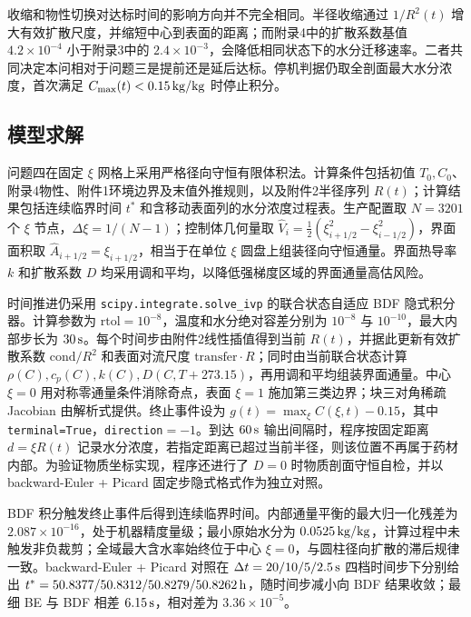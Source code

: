 \documentclass[UTF8,a4paper,12pt]{ctexart}
\numberwithin{equation}{section}
\begin{document}
收缩和物性切换对达标时间的影响方向并不完全相同。半径收缩通过 $1/R^2(t)$ 增大有效扩散尺度，并缩短中心到表面的距离；而附录4中的扩散系数基值 $4.2\times10^{-4}$ 小于附录3中的 $2.4\times10^{-3}$，会降低相同状态下的水分迁移速率。二者共同决定本问相对于问题三是提前还是延后达标。停机判据仍取全剖面最大水分浓度，首次满足 $C_{\max}(t)<0.15\rm\,kg/kg$ 时停止积分。

\subsection{模型求解}
问题四在固定 $\xi$ 网格上采用严格径向守恒有限体积法。计算条件包括初值 $T_0,C_0$、附录4物性、附件1环境边界及末值外推规则，以及附件2半径序列 $R(t)$；计算结果包括连续临界时间 $t^*$ 和含移动表面列的水分浓度过程表。生产配置取 $N=3201$ 个 $\xi$ 节点，$\Delta\xi=1/(N-1)$；控制体几何量取 $\hat V_i=\frac12(\xi_{i+1/2}^2-\xi_{i-1/2}^2)$，界面面积取 $\hat A_{i+1/2}=\xi_{i+1/2}$，相当于在单位 $\xi$ 圆盘上组装径向守恒通量。界面热导率 $k$ 和扩散系数 $D$ 均采用调和平均，以降低强梯度区域的界面通量高估风险。

时间推进仍采用 \texttt{scipy.integrate.solve\_ivp} 的联合状态自适应 BDF 隐式积分器。计算参数为 $\mathrm{rtol}=10^{-8}$，温度和水分绝对容差分别为 $10^{-8}$ 与 $10^{-10}$，最大内部步长为 $30\rm\,s$。每个时间步由附件2线性插值得到当前 $R(t)$，并据此更新有效扩散系数 $\mathrm{cond}/R^2$ 和表面对流尺度 $\mathrm{transfer}\cdot R$；同时由当前联合状态计算 $\rho(C),c_p(C),k(C),D(C,T+273.15)$，再用调和平均组装界面通量。中心 $\xi=0$ 用对称零通量条件消除奇点，表面 $\xi=1$ 施加第三类边界；块三对角稀疏 Jacobian 由解析式提供。终止事件设为 $g(t)=\max_\xi C(\xi,t)-0.15$，其中 \texttt{terminal=True}，\texttt{direction}$=-1$。到达 $60\rm\,s$ 输出间隔时，程序按固定距离 $d=\xi R(t)$ 记录水分浓度，若指定距离已超过当前半径，则该位置不再属于药材内部。为验证物质坐标实现，程序还进行了 $D=0$ 时物质剖面守恒自检，并以 backward-Euler + Picard 固定步隐式格式作为独立对照。

BDF 积分触发终止事件后得到连续临界时间。内部通量平衡的最大归一化残差为 $2.087\times10^{-16}$，处于机器精度量级；最小原始水分为 $0.0525\rm\,kg/kg$，计算过程中未触发非负裁剪；全域最大含水率始终位于中心 $\xi=0$，与圆柱径向扩散的滞后规律一致。backward-Euler + Picard 对照在 $\Delta t=20/10/5/2.5\rm\,s$ 四档时间步下分别给出 $t^*=50.8377/50.8312/50.8279/50.8262\rm\,h$，随时间步减小向 BDF 结果收敛；最细 BE 与 BDF 相差 $6.15\rm\,s$，相对差为 $3.36\times10^{-5}$。
\end{document}
